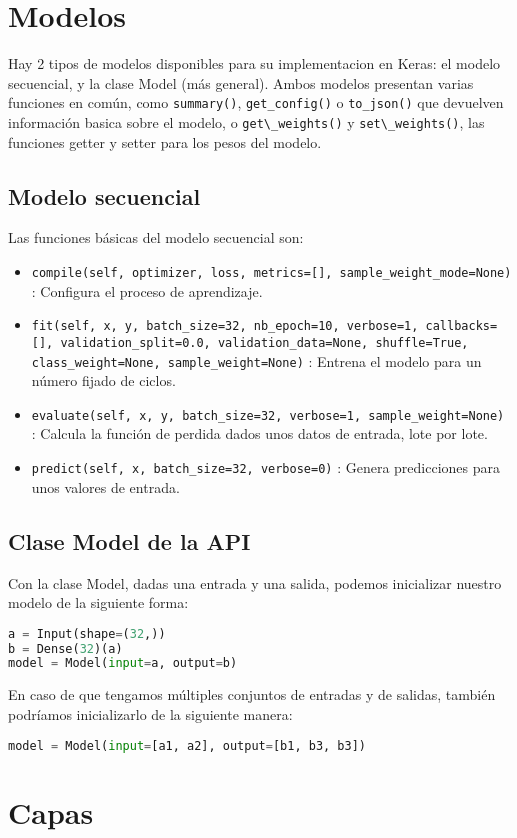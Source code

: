 \section{Modelos}
Hay 2 tipos de modelos disponibles para su implementacion en Keras: el modelo secuencial, y la clase Model (más general). Ambos modelos presentan varias funciones en común, como \lstinline{summary()}, \lstinline{get_config()} o \lstinline{to_json()} que devuelven información basica sobre el modelo, o \lstinline{get\_weights()} y \lstinline{set\_weights()}, las funciones getter y setter para los pesos del modelo.
\subsection{Modelo secuencial}
Las funciones básicas del modelo secuencial son:
\begin{itemize}
\item \lstinline{compile(self, optimizer, loss, metrics=[], sample_weight_mode=None)} : Configura el proceso de aprendizaje.
\item \lstinline{fit(self, x, y, batch_size=32, nb_epoch=10, verbose=1, callbacks=[], validation_split=0.0, validation_data=None, shuffle=True, class_weight=None, sample_weight=None)} : Entrena el modelo para un número fijado de ciclos.
\item \lstinline{evaluate(self, x, y, batch_size=32, verbose=1, sample_weight=None)} : Calcula la función de perdida dados unos datos de entrada, lote por lote.
\item \lstinline{predict(self, x, batch_size=32, verbose=0)} : Genera predicciones para unos valores de entrada.
\end{itemize}
\subsection{Clase Model de la API}
Con la clase Model, dadas una entrada y una salida, podemos inicializar nuestro modelo de la siguiente forma:
\begin{lstlisting}[language=Python]
a = Input(shape=(32,))
b = Dense(32)(a)
model = Model(input=a, output=b)
\end{lstlisting}
En caso de que tengamos múltiples conjuntos de entradas y de salidas, también podríamos inicializarlo de la siguiente manera:
\begin{lstlisting}[language=Python]
model = Model(input=[a1, a2], output=[b1, b3, b3])
\end{lstlisting}
\section{Capas}
